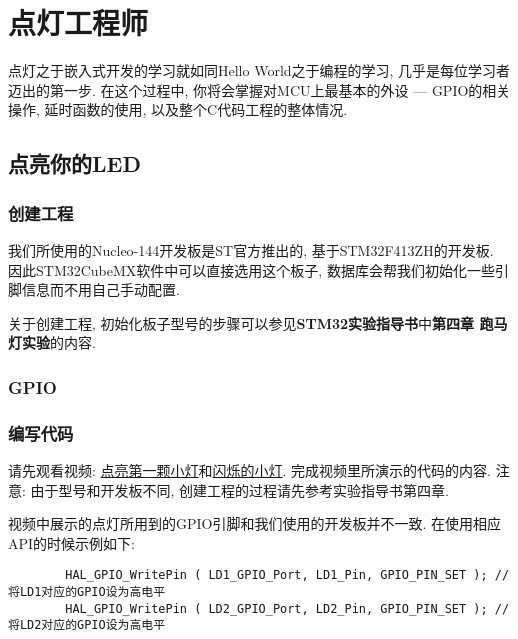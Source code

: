 \chapter{点灯工程师}

点灯之于嵌入式开发的学习就如同Hello World之于编程的学习, 几乎是每位学习者迈出的第一步. 在这个过程中, 你将会掌握对MCU上最基本的外设 --- GPIO的相关操作, 延时函数的使用, 以及整个C代码工程的整体情况.

\section{点亮你的LED}

\subsection{创建工程}

我们所使用的Nucleo-144开发板是ST官方推出的, 基于STM32F413ZH的开发板. 因此STM32CubeMX软件中可以直接选用这个板子, 数据库会帮我们初始化一些引脚信息而不用自己手动配置.

关于创建工程, 初始化板子型号的步骤可以参见\textbf{STM32实验指导书}中\textbf{第四章 跑马灯实验}的内容.

\subsection{GPIO}

\subsection{编写代码}


请先观看视频: \href{https://www.bilibili.com/video/BV1s84y1h77Q/?share_source=copy_web&vd_source=b25682b699c98b1c6e3947c9b7b66a3a}{点亮第一颗小灯}和\href{https://www.bilibili.com/video/BV1Cd4y1L7kH/?spm_id_from=333.788&vd_source=f1ae41cbb2101ee1a2a77931d719f1be}{闪烁的小灯}. 完成视频里所演示的代码的内容. 注意: 由于型号和开发板不同, 创建工程的过程请先参考实验指导书第四章.

\begin{definition}
	视频中展示的点灯所用到的GPIO引脚和我们使用的开发板并不一致. 在使用相应API的时候示例如下:

	\lstset{language=C}
	\begin{lstlisting}
		HAL_GPIO_WritePin ( LD1_GPIO_Port, LD1_Pin, GPIO_PIN_SET ); // 将LD1对应的GPIO设为高电平
		HAL_GPIO_WritePin ( LD2_GPIO_Port, LD2_Pin, GPIO_PIN_SET ); // 将LD2对应的GPIO设为高电平
	\end{lstlisting}

\end{definition}

